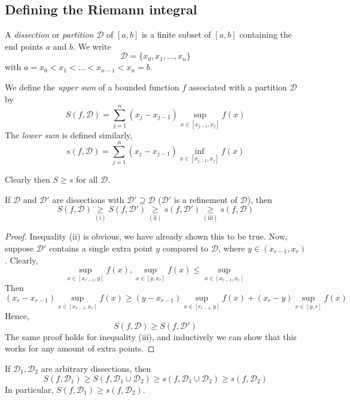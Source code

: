 \subsection{Defining the Riemann integral}
\begin{definition}
	A \textit{dissection} or \textit{partition} \(\mathcal D\) of \([a, b]\) is a finite subset of \([a, b]\) containing the end points \(a\) and \(b\).
	We write
	\[
		\mathcal D = \{ x_0, x_1, \dots, x_n \}
	\]
	with \(a = x_0 < x_1 < \dots < x_{n-1} < x_n = b\).
\end{definition}
\begin{definition}
	We define the \textit{upper sum} of a bounded function \(f\) associated with a partition \(\mathcal D\) by
	\[
		S(f, \mathcal D) = \sum_{j=1}^n (x_j - x_{j-1}) \sup_{x \in [x_{j-1}, x_j]} f(x)
	\]
	The \textit{lower sum} is defined similarly,
	\[
		s(f, \mathcal D) = \sum_{j=1}^n (x_j - x_{j-1}) \inf_{x \in [x_{j-1}, x_j]} f(x)
	\]
\end{definition}
\noindent Clearly then \(S \geq s\) for all \(\mathcal D\).
\begin{lemma}
	If \(\mathcal D\) and \(\mathcal D'\) are dissections with \(\mathcal D' \supseteq \mathcal D\) (\(\mathcal D'\) is a refinement of \(\mathcal D\)), then
	\[
		S(f, \mathcal D) \underset{(\mathrm{i})}{\geq} S(f, \mathcal D') \underset{(\mathrm{ii})}{\geq} s(f, \mathcal D') \underset{(\mathrm{iii})}{\geq} s(f, \mathcal D)
	\]
\end{lemma}
\begin{proof}
	Inequality (ii) is obvious, we have already shown this to be true.
	Now, suppose \(\mathcal D'\) contains a single extra point \(y\) compared to \(\mathcal D\), where \(y \in (x_{r-1}, x_r)\).
	Clearly,
	\[
		\sup_{x \in [x_{r-1}, y]} f(x), \sup_{x \in [y, x_r]} f(x) \leq \sup_{x \in [x_{r-1}, x_r]}
	\]
	Then
	\[
		(x_r - x_{r-1}) \sup_{x \in [x_{r-1}, x_r]} f(x) \geq (y-x_{r-1}) \sup_{x \in [r_{r-1}, y]} f(x) + (x_r - y) \sup_{x \in [y, r]} f(x)
	\]
	Hence,
	\[
		S(f, \mathcal D) \geq S(f, \mathcal D')
	\]
	The same proof holds for inequality (iii), and inductively we can show that this works for any amount of extra points.
\end{proof}
\begin{lemma}
	If \(\mathcal D_1, \mathcal D_2\) are arbitrary dissections, then
	\[
		S(f, \mathcal D_1) \geq S(f, \mathcal D_1 \cup \mathcal D_2) \geq s(f, \mathcal D_1 \cup \mathcal D_2) \geq s(f, \mathcal D_2)
	\]
	In particular, \(S(f, \mathcal D_1) \geq s(f, \mathcal D_2)\).
\end{lemma}
